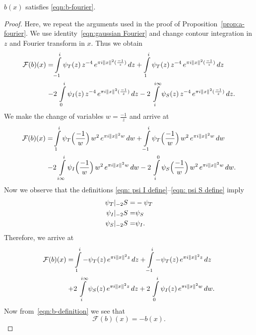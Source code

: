 \begin{proposition}\label{prop:b-fourier}
$b(x)$ satisfies \eqref{eqn:b-fourier}.
\end{proposition}
\begin{proof}
Here, we repeat the arguments used in the proof of Proposition~\ref{prop:a-fourier}.
We use identity~\eqref{eqn:gaussian Fourier} and change contour integration in $z$ and Fourier transform in $x$. Thus we obtain
\begin{align}
    \mathcal{F}(b)(x)= & \int\limits_{-1}^{i}\psi_T(z)\,z^{-4}\,e^{\pi i \|x\|^2 (\frac{-1}{z})}\,dz
        + \int\limits_{1}^{i}\psi_T(z)\,z^{-4}\,e^{\pi i \|x\|^2 (\frac{-1}{z})}\,dz \notag \\
    -& 2\,\int\limits_{0}^{i}\psi_I(z)\,z^{-4}\,e^{\pi i \|x\|^2 (\frac{-1}{z})}\,dz
    - 2\,\int\limits_{i}^{i\infty}\psi_S(z)\,z^{-4}\,e^{\pi i \|x\|^2 (\frac{-1}{z})}\,dz. \notag
\end{align}
We make the change of variables $w=\frac{-1}{z}$ and arrive at
\begin{align}
    \mathcal{F}(b)(x)= & \int\limits_{1}^{i}\psi_T\Big(\frac{-1}{w}\Big)\,w^{2}\,e^{\pi i \|x\|^2 w}\,dw
        + \int\limits_{-1}^{i}\psi_T\Big(\frac{-1}{w}\Big)\,w^{2}\,e^{\pi i \|x\|^2 w}\,dw \notag \\
    -& 2\,\int\limits_{i\infty}^{i}\psi_I\Big(\frac{-1}{w}\Big)\,w^{2}\,e^{\pi i \|x\|^2 w}\,dw
    - 2\,\int\limits_{i}^{0}\psi_S\Big(\frac{-1}{w}\Big)\,w^{2}\,e^{\pi i \|x\|^2 w}\,dw.\notag
\end{align}
Now we observe that the definitions \eqref{eqn: psi I define}--\eqref{eqn: psi S define}     imply
\begin{align}\psi_T|_{-2}S=&-\psi_T \notag \\
\psi_I|_{-2}S=&\psi_S \notag \\
\psi_S|_{-2}S=&\psi_I. \notag
\end{align}
Therefore, we arrive at
\begin{align}
    \mathcal{F}(b)(x)= & \int\limits_{1}^{i}-\psi_T(z)\,e^{\pi i \|x\|^2 z}\,dz
        + \int\limits_{-1}^{i}-\psi_T(z)\,e^{\pi i \|x\|^2 z}\,dz \notag \\
    +& 2\,\int\limits_{i}^{i\infty}\psi_S(z)\,e^{\pi i \|x\|^2 z}\,dz
    + 2\,\int\limits_{0}^{i}\psi_I(z)\,e^{\pi i \|x\|^2 w}\,dw.\notag
\end{align}
Now from~\eqref{eqn:b-definition} we see that
$$ \mathcal{F}(b)(x)=-b(x). $$
\end{proof}
